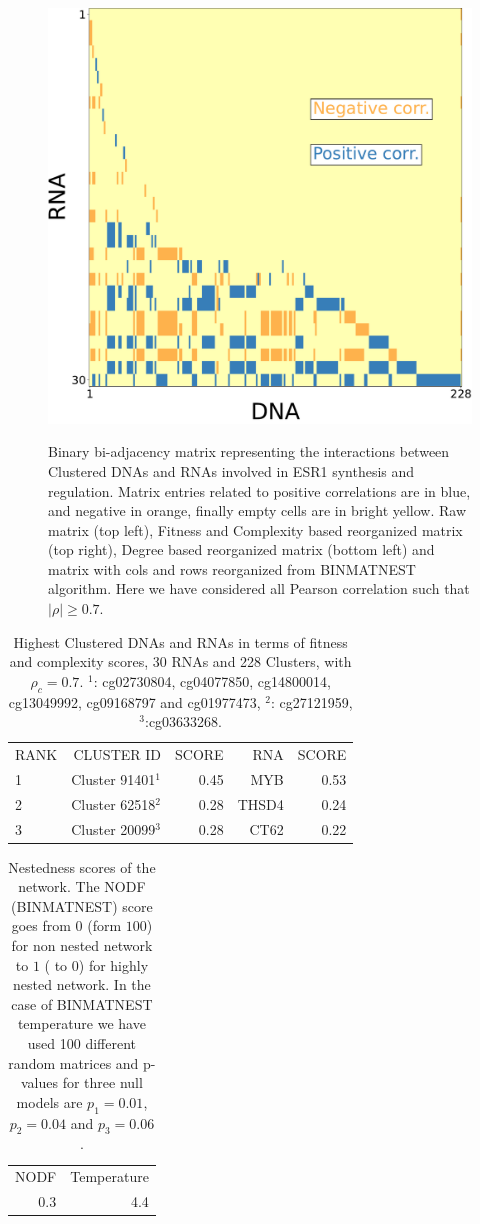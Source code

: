 \documentclass[10pt,a4paper]{article}
\begin{document}
\begin{figure}[h!]
\begin{center}
{\includegraphics[width=0.5\columnwidth]{FIG/ADN_c-ARN_BINMATNEST-ESR1-Matrix-unit-0.7.pdf}
}
\end{center}
\caption{\label{fig:fig1}Binary bi-adjacency matrix representing the interactions between Clustered DNAs and RNAs involved in ESR1 synthesis and regulation. Matrix entries related to positive correlations are in blue, and negative in orange, finally empty cells are in bright yellow. Raw matrix (top left), Fitness and Complexity based reorganized matrix (top right), Degree based reorganized matrix (bottom left) and matrix with cols and rows reorganized from BINMATNEST algorithm. Here we have considered all Pearson correlation such that $|\rho| \geq 0.7$.}
\end{figure}
 \begin{table}[h!]
\centering
\caption{\label{tab:tab1} Highest Clustered DNAs and RNAs in terms of fitness and complexity scores, 30 RNAs and 228 Clusters, with $\rho_{c} = 0.7$.
 $^{1}$: cg02730804, cg04077850, cg14800014, cg13049992, cg09168797 and cg01977473, $^{2}$: cg27121959, $^{3}$:cg03633268.}
\begin{tabular}{l|rr|rr|}
\cline{1-5}
RANK & CLUSTER ID & SCORE & RNA & SCORE\\
\cline{1-5}
1 & Cluster 91401$^{1}$ & 0.45 & MYB & 0.53\\
2 & Cluster 62518$^{2}$ & 0.28 & THSD4 & 0.24\\
3 & Cluster 20099$^{3}$ & 0.28 & CT62 & 0.22\\
\cline{1-5}
\end{tabular}
\end{table}
\begin{table}[h!]
\centering
\caption{\label{tab:tab2}Nestedness scores of the network. The NODF (BINMATNEST) score goes from $0$ (form $100$) for non nested network to $1$ ( to $0$) for highly nested network. In the case of BINMATNEST temperature we have used 100 different random matrices and p-values for three null models are $p_{1} = 0.01$, $p_{2} = 0.04$ and $p_{3} = 0.06$.}
\begin{tabular}{|r|r|}
\cline{1-2}
NODF & Temperature\\
\cline{1-2}
0.3&4.4\\
\cline{1-2}
\end{tabular}
\end{table}
\clearpage
\printbibliography
	
\end{document}
